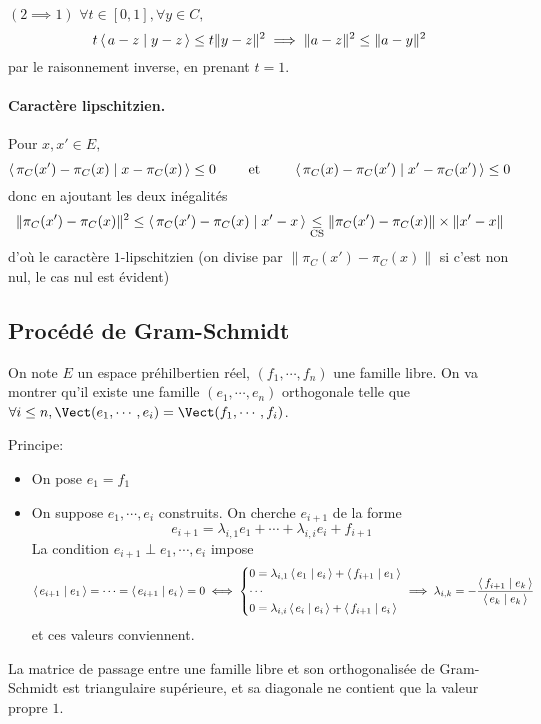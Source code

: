 $(2 \implies  1)$ $\forall  t \in  [0, 1], \forall  y \in  C,$ \[
    t\scalar{a-z}{y-z} \leq t \|y-z\|^2 \implies   \|a-z\|^2 \leq  \|a-y\|^2 
\] 
par le raisonnement inverse, en prenant $t=1$.

\paragraph*{Caractère lipschitzien.} 
Pour $x, x' \in  E,$ \[
    \scalar{\pi_C(x')-\pi_C(x)}{x-\pi_C(x)} \leq 0 \qquad  \text{ et } \qquad  \scalar{\pi_C(x)-\pi_C(x')}{x'-\pi_C(x')} \leq 0
\] 
donc en ajoutant les deux inégalités \[
    \|\pi_C(x')-\pi_C(x)\|^2 \leq \scalar{\pi_C(x')-\pi_C(x)}{x'-x} \underset{\text{CS}}\leq \|\pi_C(x')-\pi_C(x)\|\times \|x'-x\|
\] 
d'où le caractère $1$-lipschitzien (on divise par $\|\pi_C(x')-\pi_C(x)\|$ si c'est non nul, le cas nul est évident)

\subsection{Procédé de Gram-Schmidt}

On note $E$ un espace préhilbertien réel,  $(f_1, \cdots , f_n)$ une famille libre. On va montrer qu'il existe une famille $(e_1, \cdots , e_n)$ orthogonale telle que $\forall  i \leq n, \Vect(e_1, \cdots , e_i)=\Vect(f_1, \cdots , f_i)$.

Principe: \begin{itemize}
    \item On pose $e_1=f_1$
    \item On suppose  $e_1, \cdots , e_i$ construits. On cherche $e_{i+1}$ de la forme \[
    e_{i+1}=\lambda_{i,1}e_1+\cdots +\lambda_{i,i}e_i+f_{i+1}
    \] 
    La condition $e_{i+1}\perp e_1, \cdots , e_i$ impose \[
        \scalar{e_{i+1}}{e_1} = \cdots =\scalar{e_{i+1}}{e_i} =0 \iff  \begin{dcases}
            0=\lambda_{i,1} \scalar{e_1}{e_i} + \scalar{f_{i+1}}{e_1} \\
            \cdots \\
            0=\lambda_{i,i}\scalar{e_i}{e_i} +\scalar{f_{i+1}}{e_i} 
        \end{dcases} \implies \lambda_{i,k}=- \frac{\scalar{f_{i+1}}{e_k} }{\scalar{e_k}{e_k} }
    \] 
    et ces valeurs conviennent.
\end{itemize}

\begin{rem}
La matrice de passage entre une famille libre et son orthogonalisée de Gram-Schmidt est triangulaire supérieure, et sa diagonale ne contient que la valeur propre $1$.
\end{rem}

